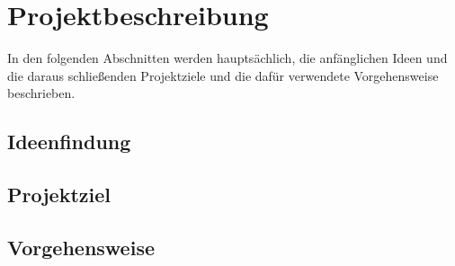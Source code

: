 \chapter{Projektbeschreibung}\label{ch:projektbeschreibung}
In den folgenden Abschnitten werden hauptsächlich, die anfänglichen Ideen und die daraus schließenden Projektziele und die dafür verwendete Vorgehensweise beschrieben.

\section{Ideenfindung}
\section{Projektziel}\label{projektziel}
\section{Vorgehensweise}
